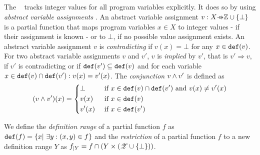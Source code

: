 \subsection{\ValueAnalysisCPA}\label{sec:valueAnalysis}
The \ \cite{Beyer2013} tracks integer values for all program variables explicitly.
It does so by using \emph{abstract variable assignments} \cite{Beyer2013}. An abstract variable assignment $v: X \partialFunc \integerset \cup \{\bot\}$ is a partial function that maps program variables $x \in X$ to integer values - if their assignment is known - or to $\bot$, if no possible value assignment exists.
An abstract variable assignment $v$ is \emph{contradicting} if $v(x) = \bot$ for any $x \in \texttt{def}(v)$.
For two abstract variable assignments $v$ and $v'$, $v$ is \emph{implied} by $v'$, that is $v' \Rightarrow v$, if $v'$ is contradicting or if $\texttt{def}(v') \subseteq \texttt{def}(v)$ and for each variable $x \in \texttt{def}(v) \cap \texttt{def}(v') : v(x) = v'(x)$.
The \emph{conjunction} $v \wedge v'$ is defined as
\[(v \wedge v')(x) = \begin{dcases}
	\bot & \text{ if } x \in \texttt{def}(v) \cap \texttt{def}(v') \text{ and } v(x) \neq v'(x)\\
	v(x) & \text{ if } x \in \texttt{def}(v)\\
	v'(x) & \text{ if } x \in \texttt{def}(v')
\end{dcases}\]

We define the \emph{definition range} of a partial function $f$ as $\texttt{def}(f) = \{ x |\ \exists y : (x, y) \in f \}$ and
the \emph{restriction} of a partial function $f$ to a new definition range $Y$ as $f_{|Y} = f \cap ( Y \times (\mathscr{Z} \cup \{ \bot \}))$.

